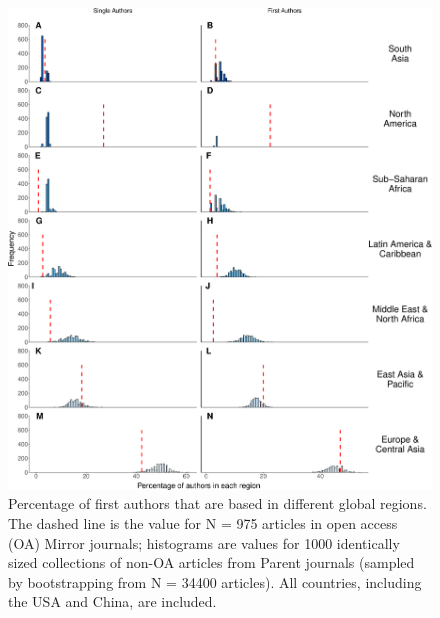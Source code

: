 \documentclass[
  english,
  man]{apa6}
\begin{document}
\begin{figure}

{\centering \includegraphics{Smith_etal_APC_ms_files/figure-latex/Fig4-1} 

}

\caption{Percentage of first authors that are based in different global regions. The dashed line is the value for N =  975  articles in open access (OA) Mirror journals; histograms are values for 1000 identically sized collections of non-OA articles from Parent journals (sampled by bootstrapping from N =  34400  articles). All countries, including the USA and China, are included.}\label{fig:Fig4}
\end{figure}
\end{document}
